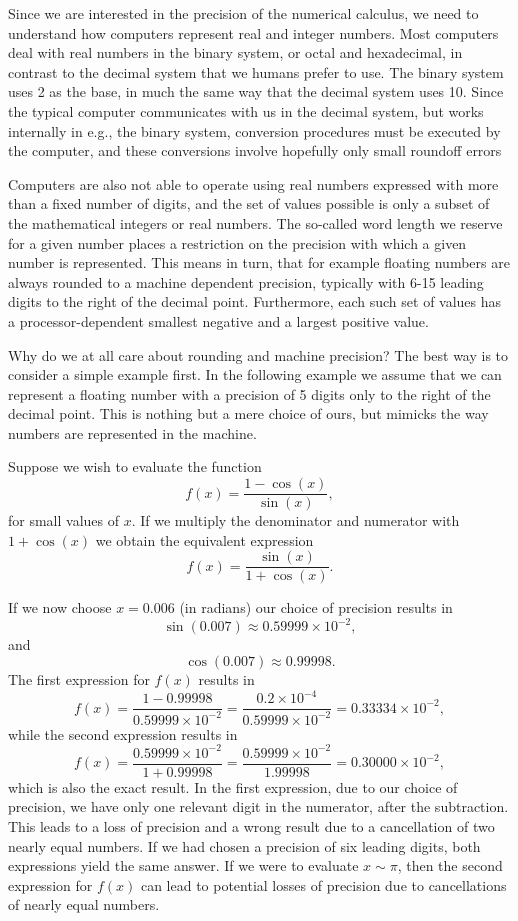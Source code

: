 Since we are interested in the precision of the numerical
calculus, we need to understand how computers
represent real and integer numbers.
Most computers deal with real numbers in the binary system, or octal and hexadecimal,
in contrast to the decimal system that we humans 
prefer to use. 
The binary system uses 2 as the base, in much the same way that the
decimal system uses 10. Since the typical computer communicates 
with us in the decimal system, but works internally in e.g., the binary 
system, conversion procedures must be executed by the computer,
and these conversions involve hopefully only small roundoff errors

Computers are also not able to operate using real numbers 
expressed with more than a fixed number of digits,  and the  
set of values possible is only a 
subset of the mathematical integers or real numbers. 
The so-called word length we reserve for a given number
places a restriction on the precision with which a given
number is represented.
This means in turn, that for example floating numbers are always
rounded to a machine dependent precision, typically with
6-15 leading digits to the right of the decimal point. 
Furthermore,
each such set of values has a processor-dependent
smallest negative and a largest positive value. 


Why do we at all care about rounding and machine precision? 
The best way is to consider a simple example first.
In the following example we
assume that we can represent a floating number with a precision
of 5 digits only to the right of the decimal point.
This is nothing but a mere choice of ours, but mimicks
the way numbers are represented in the machine.

Suppose we wish to evaluate the function
\[
   f(x)=\frac{1-\cos{(x)}}{\sin{(x)}},
\]
for small values of $x$. If we multiply the denominator and numerator
with $1+\cos{(x)}$ we obtain the equivalent expression
\[
   f(x)=\frac{\sin{(x)}}{1+\cos{(x)}}.
\]

If we now choose $x=0.006$ (in radians) our choice of precision results in
\[
   \sin{(0.007)}\approx 0.59999\times 10^{-2},
\]
and
\[
   \cos{(0.007)}\approx 0.99998.
\]
The first expression for $f(x)$ results in
\[
   f(x)=\frac{1-0.99998}{0.59999\times 10^{-2}}=\frac{0.2\times 10^{-4}}{0.59999\times 10^{-2}}=0.33334\times 10^{-2},
\]
while the second expression results in
\[
   f(x)=\frac{0.59999\times 10^{-2}}{1+0.99998}=
\frac{0.59999\times 10^{-2}}{1.99998}=0.30000\times 10^{-2},
\]
which is also the exact result. In the first expression, due to our
choice of precision, we have  
only one relevant digit in the numerator, after the 
subtraction. This leads to a loss of precision and a wrong result due to
a cancellation of two nearly equal numbers. 
If we had chosen a precision of six leading digits, both expressions
yield the same answer.
If we were to evaluate $x\sim \pi$, then the second expression for $f(x)$ 
can lead to potential losses of precision due to cancellations of nearly
equal numbers. 


